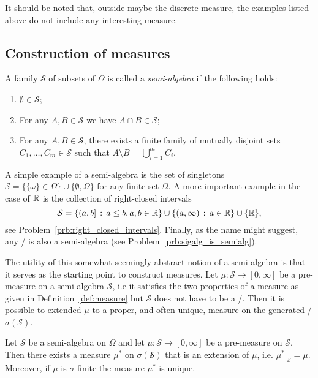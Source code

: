 It should be noted that, outside maybe the discrete measure, the examples listed above do not include any interesting measure.

\subsection{Construction of measures}



\begin{definition}
A family $\mathcal{S}$ of subsets of $\Omega$ is called a \emph{semi-algebra} if the following holds:
\begin{enumerate}
\item $\emptyset \in \mathcal{S}$;
\item For any $A, B \in \mathcal{S}$ we have $A \cap B \in \mathcal{S}$;
\item For any $A, B \in \mathcal{S}$, there exists a finite family of mutually disjoint sets $C_1, \dots, C_m \in \mathcal{S}$ such that $A \setminus B = \bigcup_{i = 1}^m C_i$.
\end{enumerate}
\end{definition}

A simple example of a semi-algebra is the set of singletons $\mathcal{S} = \{\{\omega\} \in \Omega\} \cup \{\emptyset, \Omega\}$ for any finite set $\Omega$. A more important example in the case of $\mathbb R$ is the collection of right-closed intervals
\begin{equation}\label{def:right_closed_intervals}
	\mathcal{S} = \{(a,b] \, : \, a\le b, a, b \in \mathbb R\} \cup \{(a,\infty) \, : \, a \in \mathbb R\} \cup \{\mathbb R\},
\end{equation}
see Problem~\ref{prb:right_closed_intervals}. Finally, as the name might suggest, any \sigalg/ is also a semi-algebra (see Problem~\ref{prb:sigalg_is_semialg}).

The utility of this somewhat seemingly abstract notion of a semi-algebra is that it serves as the starting point to construct measures. Let $\mu : \mathcal{S} \to [0,\infty]$ be a pre-measure on a semi-algebra $\mathcal{S}$, i.e it satisfies the two properties of a measure as given in Definition~\ref{def:measure} but $\mathcal{S}$ does not have to be a \sigalg/. Then it is possible to extended $\mu$ to a proper, and often unique, measure on the generated \sigalg/ $\sigma(\mathcal{S})$.

\begin{theorem}\label{thm:caratheodory}
Let $\mathcal{S}$ be a semi-algebra on $\Omega$ and let $\mu : \mathcal{S} \to [0,\infty]$ be a pre-measure on $\mathcal{S}$. Then there exists a measure $\mu^\ast$ on $\sigma(\mathcal{S})$ that is an extension of $\mu$, i.e. $\mu^\ast|_\mathcal{S} = \mu$. Moreover, if $\mu$ is $\sigma$-finite the measure $\mu^\ast$ is unique.
\end{theorem}

